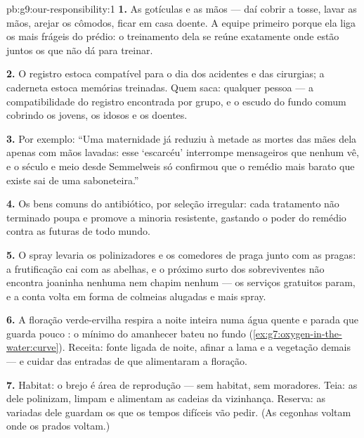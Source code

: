 \begin{solution}{pb:g9:our-responsibility:1}
\textbf{1.} As gotículas e as mãos --- daí cobrir a tosse,
lavar as mãos, arejar os cômodos, ficar em casa doente. A
equipe primeiro porque ela liga os mais frágeis do prédio: o
treinamento dela se reúne exatamente onde estão juntos os que
não dá para treinar.

\textbf{2.} O registro estoca  compatível para o dia
dos acidentes e das cirurgias; a caderneta estoca memórias
treinadas. Quem saca: qualquer pessoa --- a compatibilidade
do registro encontrada por grupo, e o escudo do fundo comum
cobrindo os jovens, os idosos e os doentes.

\textbf{3.} Por exemplo: ``Uma maternidade já reduziu à
metade as mortes das mães dela apenas com mãos lavadas: esse
`escarcéu' interrompe mensageiros que  nenhum vê, e o
século e meio desde Semmelweis só confirmou que o remédio
mais barato que existe sai de uma saboneteira.''

\textbf{4.} Os bens comuns do antibiótico, por seleção
irregular: cada tratamento não terminado poupa e promove a
minoria resistente, gastando o poder do remédio contra as
 futuras de todo mundo.

\textbf{5.} O spray levaria os polinizadores e os comedores
de praga junto com as pragas: a frutificação cai com as
abelhas, e o próximo surto dos sobreviventes não encontra
joaninha nenhuma nem chapim nenhum --- os serviços gratuitos
param, e a conta volta em forma de colmeias alugadas e mais
spray.

\textbf{6.} A floração verde-ervilha respira a noite inteira
numa água quente e parada que guarda pouco : o mínimo
do amanhecer bateu no fundo
(\cref{ex:g7:oxygen-in-the-water:curve}). Receita: fonte
ligada de noite, afinar a lama e a vegetação demais --- e
cuidar das entradas de  que alimentaram a floração.

\textbf{7.} Habitat: o brejo é área de reprodução --- sem
habitat, sem moradores. Teia: as  dele polinizam,
limpam e alimentam as cadeias da vizinhança. Reserva: as
 variadas dele guardam os  que os tempos
difíceis vão pedir. (As cegonhas voltam onde os prados
voltam.)


\end{solution}
